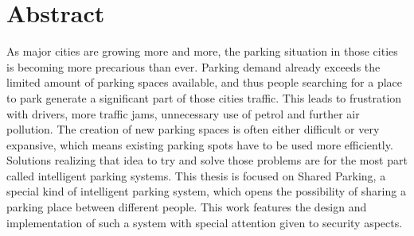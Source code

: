 \section*{Abstract}
As major cities are growing more and more, the parking situation in those cities is becoming more precarious than ever. Parking demand already exceeds the limited amount of parking spaces available, and thus people searching for a place to park generate a significant part of those cities traffic. This leads to frustration with drivers, more traffic jams, unnecessary use of petrol and further air pollution. The creation of new parking spaces is often either difficult or very expansive, which means existing parking spots have to be used more efficiently. Solutions realizing that idea to try and solve those problems are for the most part called intelligent parking systems. This thesis is focused on Shared Parking, a special kind of intelligent parking system, which opens the possibility of sharing a parking place between different people. This work features the design and implementation of such a system with special attention given to security aspects.
